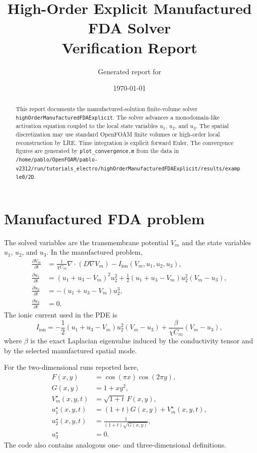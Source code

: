 \documentclass[11pt,a4paper]{article}
\title{High-Order Explicit Manufactured FDA Solver\\Verification Report}
\author{Generated report for \code{highOrderManufacturedFDAExplicit}}
\date{\today}
\newcommand{\code}[1]{\texttt{#1}}
\begin{document}
\maketitle

\begin{abstract}
This report documents the manufactured-solution finite-volume solver \code{highOrderManufacturedFDAExplicit}. The solver advances a monodomain-like activation equation coupled to the local state variables $u_1$, $u_2$, and $u_3$. The spatial discretization may use standard OpenFOAM finite volumes or high-order local reconstruction by LRE. Time integration is explicit forward Euler. The convergence figures are generated by \code{plot\_convergence.m} from the data in \code{/home/pablo/OpenFOAM/pablo-v2312/run/tutorials\_electro/highOrderManufacturedFDAExplicit/results/example0/2D}.
\end{abstract}

\section{Manufactured FDA problem}
The solved variables are the transmembrane potential $V_m$ and the state variables $u_1$, $u_2$, and $u_3$. In the manufactured problem,
\begin{align}
\frac{\partial V_m}{\partial t} &= \frac{1}{\chi C_m}\nabla\cdot(D\nabla V_m) - I_{\mathrm{ion}}(V_m,u_1,u_2,u_3),\\
\frac{\partial u_1}{\partial t} &= (u_1+u_3-V_m)^2u_2^2 + \frac{1}{2}(u_1+u_3-V_m)u_2^2(V_m-u_3),\\
\frac{\partial u_2}{\partial t} &= -(u_1+u_3-V_m)u_2^3,\\
\frac{\partial u_3}{\partial t} &= 0.
\end{align}
The ionic current used in the PDE is
\begin{equation}
I_{\mathrm{ion}} = -\frac{1}{2}(u_1+u_3-V_m)u_2^2(V_m-u_3)
+ \frac{\beta}{\chi C_m}(V_m-u_3),
\end{equation}
where $\beta$ is the exact Laplacian eigenvalue induced by the conductivity tensor and by the selected manufactured spatial mode.

For the two-dimensional runs reported here,
\begin{align}
F(x,y) &= \cos(\pi x)\cos(2\pi y),\\
G(x,y) &= 1 + x y^2,\\
V_m^{\star}(x,y,t) &= \sqrt{1+t}\,F(x,y),\\
u_1^{\star}(x,y,t) &= (1+t)G(x,y) + V_m^{\star}(x,y,t),\\
u_2^{\star}(x,y,t) &= \frac{1}{(1+t)\sqrt{G(x,y)}},\\
u_3^{\star} &= 0.
\end{align}
The code also contains analogous one- and three-dimensional definitions.
\end{document}

